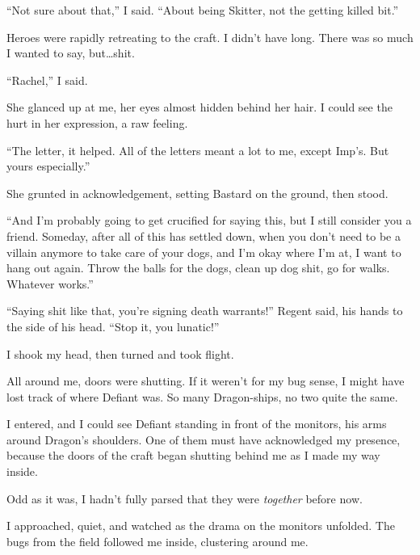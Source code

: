 ``Not sure about that,'' I said.  ``About being Skitter, not the getting killed bit.''



Heroes were rapidly retreating to the craft.  I didn't have long.  There was so much I wanted to say, but\ldots shit.



``Rachel,'' I said.



She glanced up at me, her eyes almost hidden behind her hair.  I could see the hurt in her expression, a raw feeling.



``The letter, it helped.  All of the letters meant a lot to me, except Imp's.  But yours especially.''



She grunted in acknowledgement, setting Bastard on the ground, then stood.



``And I'm probably going to get crucified for saying this, but I still consider you a friend.  Someday, after all of this has settled down, when you don't need to be a villain anymore to take care of your dogs, and I'm okay where I'm at, I want to hang out again.  Throw the balls for the dogs, clean up dog shit, go for walks.  Whatever works.''



``Saying shit like that, you're signing death warrants!'' Regent said, his hands to the side of his head.  ``Stop it, you lunatic!''



I shook my head, then turned and took flight.



All around me, doors were shutting.  If it weren't for my bug sense, I might have lost track of where Defiant was.  So many Dragon-ships, no two quite the same.



I entered, and I could see Defiant standing in front of the monitors, his arms around Dragon's shoulders.  One of them must have acknowledged my presence, because the doors of the craft began shutting behind me as I made my way inside.



Odd as it was, I hadn't fully parsed that they were \emph{together} before now.



I approached, quiet, and watched as the drama on the monitors unfolded.  The bugs from the field followed me inside, clustering around me.



